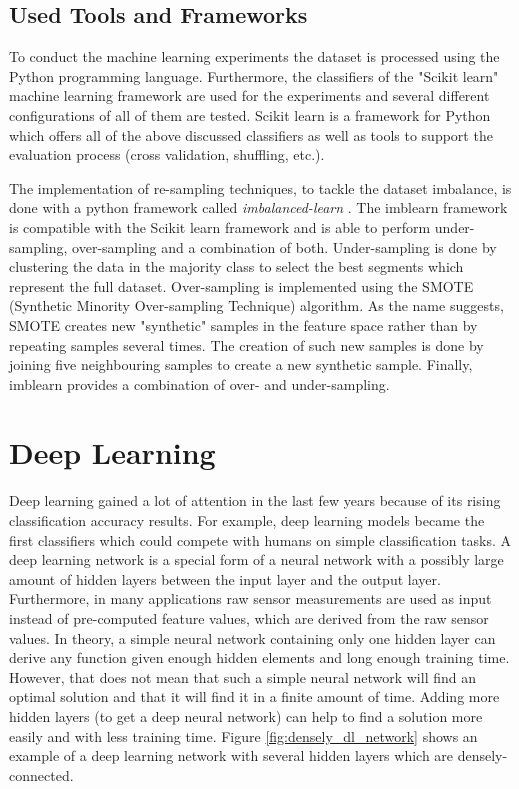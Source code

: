 \subsection{Used Tools and Frameworks}

To conduct the machine learning experiments the dataset is processed using the Python programming language. Furthermore, the classifiers of the "Scikit learn" machine learning framework are used for the experiments and several different configurations of all of them are tested. Scikit learn is a framework for Python which offers all of the above discussed classifiers as well as tools to support the evaluation process (cross validation, shuffling, etc.).

The implementation of re-sampling techniques, to tackle the dataset imbalance, is done with a python framework called \emph{imbalanced-learn} \cite{imblearn_reference}. The imblearn framework is compatible with the Scikit learn framework and is able to perform under-sampling, over-sampling and a combination of both. Under-sampling is done by clustering the data in the majority class to select the best segments which represent the full dataset. Over-sampling is implemented using the SMOTE (Synthetic Minority Over-sampling Technique) algorithm. As the name suggests, SMOTE creates new "synthetic" samples in the feature space rather than by repeating samples several times. The creation of such new samples is done by joining five neighbouring samples to create a new synthetic sample. Finally, imblearn provides a combination of over- and under-sampling.







\section{Deep Learning}
\label{sec:deep_learning}

Deep learning gained a lot of attention in the last few years because of its rising classification accuracy results. For example, deep learning models became the first classifiers which could compete with humans on simple classification tasks.  A deep learning network is a special form of a neural network with a possibly large amount of hidden layers between the input layer and the output layer. Furthermore, in many applications raw sensor measurements are used as input instead of pre-computed feature values, which are derived from the raw sensor values. In theory, a simple neural network containing only one hidden layer can derive any function given enough hidden elements and long enough training time. However, that does not mean that such a simple neural network will find an optimal solution and that it will find it in a finite amount of time. Adding more hidden layers (to get a deep neural network) can help to find a solution more easily and with less training time. 
Figure \ref{fig:densely_dl_network} shows an example of a deep learning network with several hidden layers which are densely-connected.

